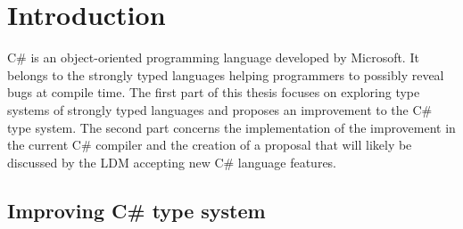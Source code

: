 \chapter{Introduction}

C\# is an object-oriented programming language developed by Microsoft. 
It belongs to the strongly typed languages helping programmers to possibly reveal bugs at compile time. 
The first part of this thesis focuses on exploring type systems of strongly typed languages and proposes an improvement to the C\# type system. 
The second part concerns the implementation of the improvement in the current C\# compiler and the creation of a proposal that will likely be discussed by the \ac{LDM} accepting new C\# language features.

\section{Improving C\# type system}

